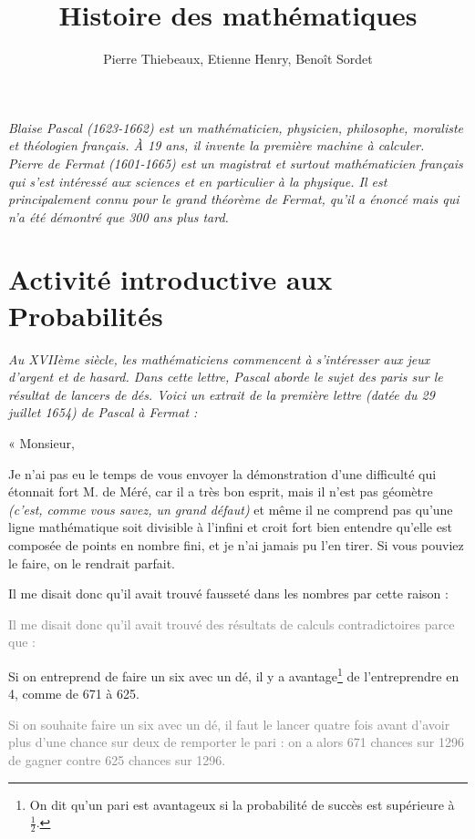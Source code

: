 \documentclass[frenchb]{article}
\title{Histoire des mathématiques}
\author{Pierre Thiebeaux, Etienne Henry, Benoît Sordet}
\date{}
\begin{document}
\maketitle

\textit{Blaise Pascal (1623-1662) est un mathématicien, physicien, philosophe, moraliste et théologien français. À 19 ans, il invente la première machine à calculer.} \\

\textit{Pierre de Fermat (1601-1665) est un magistrat et surtout mathématicien français qui s'est intéressé aux sciences et en particulier à la physique. Il est principalement connu pour le grand théorème de Fermat, qu'il a énoncé mais qui n'a été démontré que 300 ans plus tard.}

\section*{Activité introductive aux Probabilités}
\textit{Au XVIIème siècle, les mathématiciens commencent à s’intéresser aux jeux d’argent et de hasard. Dans cette lettre, Pascal aborde le sujet des paris sur le résultat de lancers de dés. Voici un extrait de la première lettre (datée du 29 juillet 1654) de Pascal à Fermat :\\}

« Monsieur,

Je n'ai pas eu le temps de vous envoyer la démonstration d'une difficulté qui étonnait fort M. de Méré, car il a très bon esprit, mais il n'est pas géomètre \textit{(c'est, comme vous savez, un grand défaut)} et même il ne comprend pas qu'une ligne mathématique soit divisible à l'infini et croit fort bien entendre qu'elle est composée de points en nombre fini, et je n'ai jamais pu l'en tirer. Si vous pouviez le faire, on le rendrait parfait. 

Il me disait donc qu'il avait trouvé fausseté dans les nombres par cette raison :

\textcolor{gray}{Il me disait donc qu’il avait trouvé des résultats de calculs contradictoires parce que : }

Si on entreprend de faire un six avec un dé, il y a avantage\footnote{On dit qu'un pari est avantageux si la probabilité de succès est supérieure à $\frac{1}{2}.$} de l'entreprendre en 4, comme de 671 à 625.

\textcolor{gray}{Si on souhaite faire un six avec un dé, il faut le lancer quatre fois avant d’avoir plus d’une chance sur deux de remporter le pari : on a alors 671 chances sur 1296 de gagner contre 625 chances sur 1296.}
\end{document}
